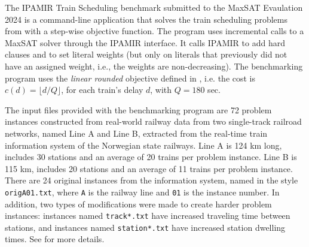 \documentclass[conference]{IEEEtran}
\begin{document}
The IPAMIR Train Scheduling benchmark submitted to the MaxSAT Evaulation 2024
is a command-line application that solves the train scheduling problems from
\cite{croella2024maxsat} with a step-wise objective function.
The program uses incremental calls to a MaxSAT solver through the IPAMIR
interface.  It calls IPAMIR to add hard clauses and to set literal weights (but
only on literals that previously did not have an assigned weight, i.e., the
weights are
non-decreasing).
The benchmarking program uses the \emph{linear rounded} objective defined in 
\cite{croella2024maxsat}, i.e. the cost is $c(d) =  \lfloor d / Q \rfloor $,
for each train's delay $d$, with $Q=180$ sec.

The input files provided with the benchmarking program 
are 72 problem instances constructed from real-world railway data
from two single-track
railroad networks, named Line A and Line B, 
extracted from the real-time train information system of the Norwegian state railways. 
Line A is 124 km long, includes 30 stations and
an average of 20 trains per problem instance.
Line B is 115 km, includes 20 stations and an average of 11 trains per problem instance.
There are 24 original instances from the information system, 
named in the style \texttt{origA01.txt}, where \texttt{A} is the 
railway line and \texttt{01} is the instance number.
In addition, two types of modifications were made to create harder problem instances:
instances named \texttt{track*.txt} have increased traveling time between stations,
and instances named \texttt{station*.txt} have increased station dwelling times.
See \cite{croella2024maxsat} for more details.
 


\printbibliography
\end{document}
